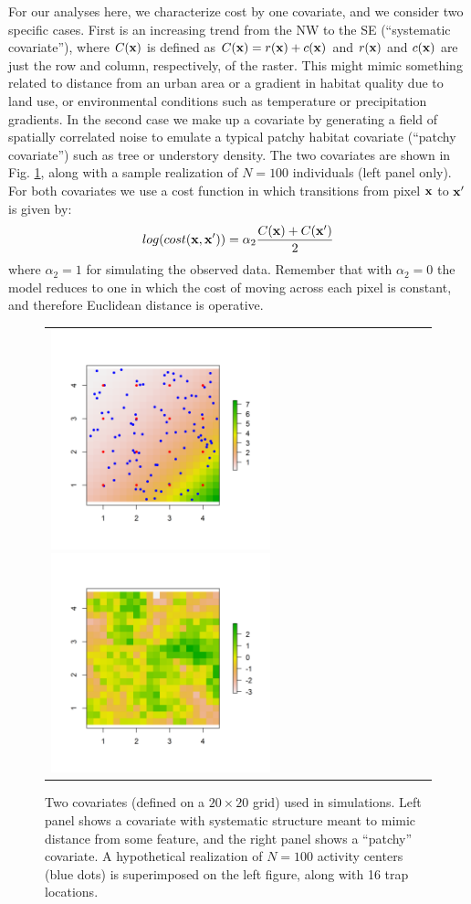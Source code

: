 For our analyses here, we characterize cost by one covariate,
and we consider two specific cases. First is an increasing trend from
the NW to the SE (``systematic covariate''), where $C({\bf x})$ is defined as
$C({\bf x}) = r({\bf x}) + c({\bf x})$ and $r({\bf x})$ and $c({\bf x})$ are just the row and
column, respectively, of the raster.  This might mimic something
related to distance from an urban area or a gradient in habitat
quality due to land use, or environmental conditions such as
temperature or precipitation gradients.  In the second case we make up
a covariate by generating a field of spatially correlated noise to
emulate a typical patchy habitat covariate (``patchy covariate'') such as
tree or understory density. The two covariates are shown in
Fig. \ref{ecoldist.fig.raster100}, along with a sample realization of
$N=100$ individuals (left panel only).  For both covariates we use a
cost function in which transitions from pixel ${\bf x}$ to ${\bf x}'$
is given by:
\[
 log(cost({\bf x},{\bf x}'))=  \alpha_2 \frac{C({\bf x}) + C({\bf x}')}{2}
\]
where $\alpha_2 = 1$ for simulating the observed data.
 Remember that with $\alpha_2=0$ the
model reduces to one in which the cost of moving across each pixel is
constant, and therefore Euclidean distance is operative.

\begin{figure}[h]
\begin{tabular}{ll}
\includegraphics[height=2.5in,width=2.5in]{Ch12-EcolDist/figs/raster_withN100}
\includegraphics[height=2.5in,width=2.5in]{Ch12-EcolDist/figs/raster_krige} &
\end{tabular}
\caption{Two covariates (defined on a $20 \times 20$ grid) used in simulations.
 Left panel shows a
 covariate with systematic structure meant
to mimic distance from some feature, and the right panel
 shows a ``patchy'' covariate.
A hypothetical
  realization of $N=100$ activity centers (blue dots) is superimposed
  on the left figure,
along with 16 trap locations. }
\label{ecoldist.fig.raster100}
\end{figure}


